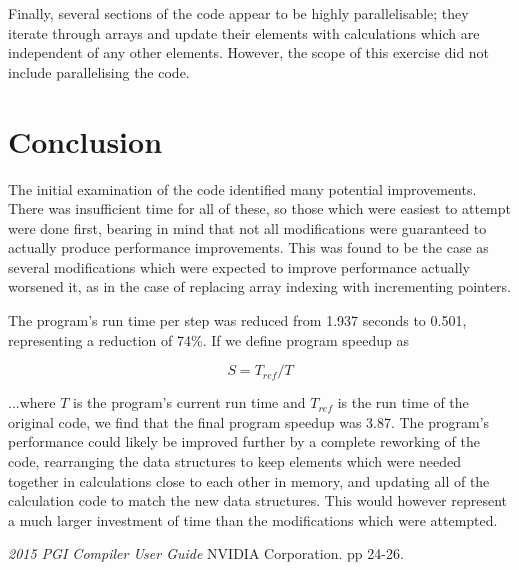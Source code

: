 \documentclass[11pt, oneside]{article}   %
\begin{document}
Finally, several sections of the code appear to be highly parallelisable; they iterate through arrays and update their elements with calculations which are independent of any other elements.
However, the scope of this exercise did not include parallelising the code.

\section{Conclusion}

The initial examination of the code identified many potential improvements.
There was insufficient time for all of these, so those which were easiest to attempt were done first, bearing in mind that not all modifications were guaranteed to actually produce performance improvements.
This was found to be the case as several modifications which were expected to improve performance actually worsened it, as in the case of replacing array indexing with incrementing pointers.

The program's run time per step was reduced from 1.937 seconds to 0.501, representing a reduction of 74\%.
If we define program speedup as 

\begin{equation}
S = T_{ref}/T
\label{equation:speedup}
\end{equation}

...where ${T}$ is the program's current run time and $T_{ref}$ is the run time of the original code, we find that the final program speedup was 3.87.
The program's performance could likely be improved further by a complete reworking of the code, rearranging the data structures to keep elements which were needed together in calculations close to each other in memory, and updating all of the calculation code to match the new data structures.
This would however represent a much larger investment of time than the modifications which were attempted.


\begin{thebibliography}{100}

 {\em 2015 PGI Compiler User Guide} NVIDIA Corporation. pp 24-26.

\end{thebibliography}
\end{document}
